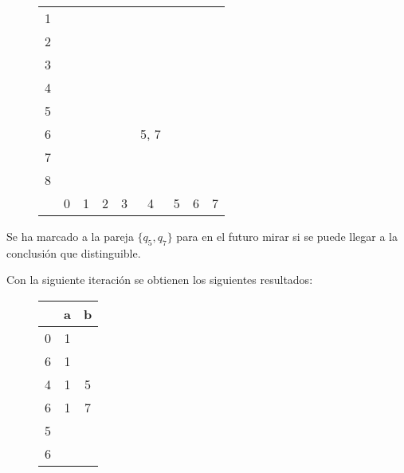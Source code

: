 \documentclass[11pt,a4paper]{article}
\begin{document}
		\begin{figure}[H]
			\centering
			\begin{tabular}{*{9}{c|}}
																							\cline{2-2}
				1 & \color{blue}{X}															\\ \cline{2-3}
				2 & \color{blue}{X} &														\\ \cline{2-4}
				3 & \color{blue}{X} & &											\\ \cline{2-5}
				4 & & \color{blue}{X} & \color{blue}{X} & \color{blue}{X}	\\ \cline{2-6}
				5 & & \color{blue}{X} & \color{blue}{X} & \color{blue}{X} & \\ \cline{2-7}
				6 & & \color{blue}{X} & \color{blue}{X} & \color{blue}{X} & 5, 7 & \\ \cline{2-8}
				7 & \color{red}{X} & \color{blue}{X} & \color{blue}{X} & \color{blue}{X} & \color{red}{X} & 
				  & \color{red}{X} \\ \cline{2-9}
				8 & \color{blue}{X} & \color{red}{X} & \color{red}{X} & \color{red}{X} & \color{blue}{X} & \color{blue}{X} &
					\color{blue}{X} & \color{blue}{X} \\ \cline{2-9}
				\multicolumn{0}{c}{} & \multicolumn{1}{c}{0} & \multicolumn{1}{c}{1} & \multicolumn{1}{c}{2}
				& \multicolumn{1}{c}{3} & \multicolumn{1}{c}{4} & \multicolumn{1}{c}{5} & \multicolumn{1}{c}{6}
				& \multicolumn{1}{c}{7}
			\end{tabular}
		\end{figure}
		
		Se ha marcado a la pareja $\{q_5, q_7\}$ para en el futuro mirar si se puede llegar a la conclusión que distinguible.
		\par
		
		Con la siguiente iteración se obtienen los siguientes resultados:
		
		\begin{figure}[H]
			\centering
			\begin{tabular}{c|cc}
				& a & b		\\ \hline
				0 & 1 & \color{red}{3}	\\
				6 & 1 & \color{red}{7}	\\ \hline
				4 & 1 & 5	\\
				6 & 1 & 7	\\ \hline
				5 & \color{red}{6} & \color{red}{3}	\\
				6 & \color{red}{1} & \color{red}{7}	\\ \hline		
			\end{tabular}
		\end{figure}
		
\end{document}
